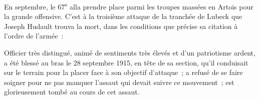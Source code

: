 \documentclass[french,twoside]{book} %
\newenvironment{quoteblock}%
  {\begin{quoting}}
  {\end{quoting}}
\newenvironment{quotebar}{%
    \def\FrameCommand{{\color{rubric!10!}\vrule width 0.5em} \hspace{0.9em}}%
    \def\OuterFrameSep{\itemsep} %
    \MakeFramed {\advance\hsize-\width \FrameRestore}
  }%
  {%
    \endMakeFramed
  }
\renewenvironment{quoteblock}%
  {%
    \savenotes
    \setstretch{0.9}
    \normalfont
    \begin{quotebar}
  }
  {%
    \end{quotebar}
    \spewnotes
  }
\begin{document}
\begin{quoteblock}
 \end{quoteblock}

\noindent En septembre, le 67\textsuperscript{e} alla prendre place parmi les troupes massées en Artois pour la grande offensive. C’est à la troisième attaque de la tranchée de Lubeck que Joseph Hudault trouva la mort, dans les conditions que précise sa citation à l’ordre de l’armée :‌\par

\begin{quoteblock}
 \noindent Officier très distingué, animé de sentiments très élevés et d’un patriotisme ardent, a été blessé au bras le 28 septembre 1915, en tête de sa section, qu’il conduisait sur le terrain pour la placer face à son objectif d’attaque ; a refusé de se faire soigner pour ne pas manquer l’assaut qui devait suivre ce mouvement ; est glorieusement tombé au cours de cet assaut.‌
 \end{quoteblock}
\end{document}
